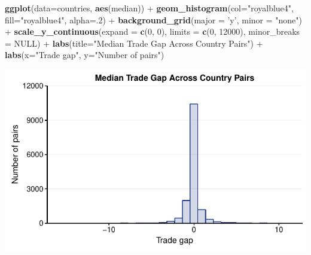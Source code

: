 \documentclass[10pt,]{article}
\newenvironment{Shaded}{\begin{snugshade}}{\end{snugshade}}
\newcommand{\KeywordTok}[1]{\textcolor[rgb]{0.13,0.29,0.53}{\textbf{{#1}}}}
\newcommand{\DataTypeTok}[1]{\textcolor[rgb]{0.13,0.29,0.53}{{#1}}}
\newcommand{\DecValTok}[1]{\textcolor[rgb]{0.00,0.00,0.81}{{#1}}}
\newcommand{\StringTok}[1]{\textcolor[rgb]{0.31,0.60,0.02}{{#1}}}
\newcommand{\OtherTok}[1]{\textcolor[rgb]{0.56,0.35,0.01}{{#1}}}
\newcommand{\NormalTok}[1]{{#1}}
\begin{document}
\begin{Shaded}
\begin{Highlighting}[]
\KeywordTok{ggplot}\NormalTok{(}\DataTypeTok{data=}\NormalTok{countries, }\KeywordTok{aes}\NormalTok{(median)) +}
\StringTok{  }\KeywordTok{geom_histogram}\NormalTok{(}\DataTypeTok{col=}\StringTok{"royalblue4"}\NormalTok{,}
                 \DataTypeTok{fill=}\StringTok{"royalblue4"}\NormalTok{,}
                 \DataTypeTok{alpha=}\NormalTok{.}\DecValTok{2}\NormalTok{) +}
\StringTok{  }\KeywordTok{background_grid}\NormalTok{(}\DataTypeTok{major =} \StringTok{'y'}\NormalTok{, }\DataTypeTok{minor =} \StringTok{"none"}\NormalTok{) +}
\StringTok{  }\KeywordTok{scale_y_continuous}\NormalTok{(}\DataTypeTok{expand =} \KeywordTok{c}\NormalTok{(}\DecValTok{0}\NormalTok{, }\DecValTok{0}\NormalTok{), }\DataTypeTok{limits =} \KeywordTok{c}\NormalTok{(}\DecValTok{0}\NormalTok{, }\DecValTok{12000}\NormalTok{),  }\DataTypeTok{minor_breaks =} \OtherTok{NULL}\NormalTok{) +}
\StringTok{  }\KeywordTok{labs}\NormalTok{(}\DataTypeTok{title=}\StringTok{"Median Trade Gap Across Country Pairs"}\NormalTok{) +}
\StringTok{  }\KeywordTok{labs}\NormalTok{(}\DataTypeTok{x=}\StringTok{"Trade gap"}\NormalTok{, }\DataTypeTok{y=}\StringTok{"Number of pairs"}\NormalTok{)}
\end{Highlighting}
\end{Shaded}

\begin{center}\includegraphics{Figs/value_time-7} \end{center}
\end{document}
